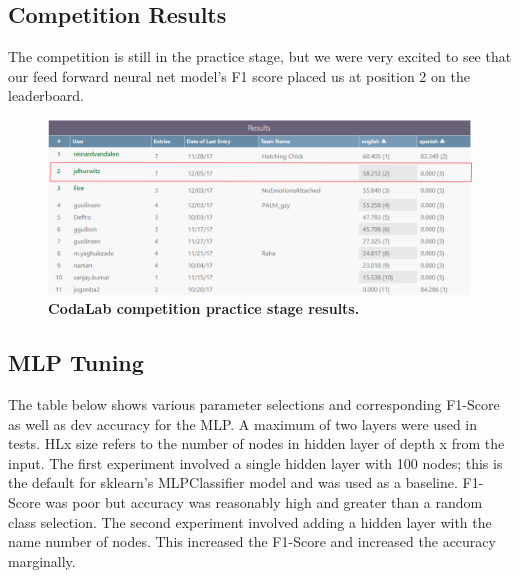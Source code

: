 \documentclass[11pt,a4paper]{article}
\begin{document}
\subsection{Competition Results}
The competition is still in the practice stage, but we were very excited to see that our feed forward neural net model's F1 score placed us at position 2 on the leaderboard.
\begin{figure}[H]
	\centering\includegraphics[scale=0.2]{leaderboard} 
	\caption{\textbf{ CodaLab competition practice stage results.}}
\end{figure}

\subsection{MLP Tuning}
The table below shows various parameter selections and corresponding F1-Score as well as dev accuracy for the MLP. A maximum of two layers were used in tests. HLx size refers to the number of nodes in hidden layer of depth x from the input. The first experiment involved a single hidden layer with 100 nodes; this is the default for sklearn’s MLPClassifier model and was used as a baseline. F1-Score was poor but accuracy was reasonably high and greater than a random class selection. The second experiment involved adding a hidden layer with the name number of nodes. This increased the F1-Score and increased the accuracy marginally.
\end{document}
